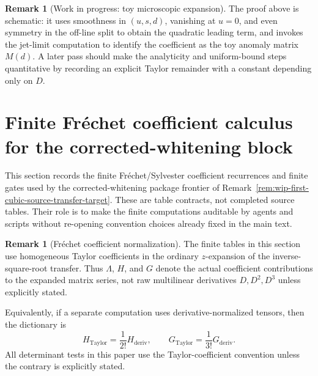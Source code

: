 \documentclass[11pt,a4paper]{amsart}
\theoremstyle{plain}
\theoremstyle{definition}
\newtheorem{remark}[theorem]{Remark}
\begin{document}
\begin{remark}[Work in progress: toy microscopic expansion]
\label{rem:wip-toy-microscopic-expansion}
The proof above is schematic: it uses smoothness in $(u,s,d)$, vanishing at
$u=0$, and even symmetry in the off-line split to obtain the quadratic
leading term, and invokes the jet-limit computation to identify the
coefficient as the toy anomaly matrix $M(d)$. A later pass should make the
analyticity and uniform-bound steps quantitative by recording an explicit
Taylor remainder with a constant depending only on $D$.
\end{remark}

\section{Finite Fr\'echet coefficient calculus for the corrected-whitening block}
\label{sec:finite-frechet-coefficient-calculus}

This section records the finite Fr\'echet/Sylvester coefficient recurrences
and finite gates used by the corrected-whitening package frontier of
Remark~\ref{rem:wip-first-cubic-source-transfer-target}.  These are table
contracts, not completed source tables.  Their role is to make the finite
computations auditable by agents and scripts without re-opening convention
choices already fixed in the main text.

\begin{remark}[Fr\'echet coefficient normalization]
\label{rem:frechet-coefficient-normalization}
The finite tables in this section use homogeneous Taylor coefficients in the
ordinary \(z\)-expansion of the inverse-square-root transfer.  Thus
\(\Lambda\), \(H\), and \(G\) denote the actual coefficient contributions to
the expanded matrix series, not raw multilinear derivatives \(D,D^2,D^3\)
unless explicitly stated.

Equivalently, if a separate computation uses derivative-normalized tensors,
then the dictionary is
\[
H_{\mathrm{Taylor}}=\frac{1}{2!}H_{\mathrm{deriv}},
\qquad
G_{\mathrm{Taylor}}=\frac{1}{3!}G_{\mathrm{deriv}}.
\]
All determinant tests in this paper use the Taylor-coefficient convention
unless the contrary is explicitly stated.
\end{remark}
\end{document}
